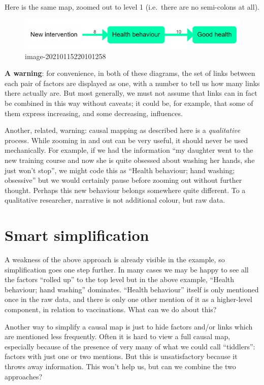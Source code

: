 \documentclass[
]{book}
\begin{document}
Here is the same map, zoomed out to level 1 (i.e.~there are no semi-colons at all).

\begin{figure}
\centering
\includegraphics{_assets/image-20210115220101258.png}
\caption{image-20210115220101258}
\end{figure}

\textbf{A warning}: for convenience, in both of these diagrams, the set of links between each pair of factors are displayed as one, with a number to tell us how many links there actually are. But most generally, we must not assume that links can in fact be combined in this way without caveats; it could be, for example, that some of them express increasing, and some decreasing, influences.

Another, related, warning: causal mapping as described here is a \emph{qualitative} process. While zooming in and out can be very useful, it should never be used mechanically. For example, if we had the information ``my daughter went to the new training course and now she is quite obsessed about washing her hands, she just won't stop'', we might code this as ``Health behaviour; hand washing; obsessive'' but we would certainly pause before zooming out without further thought. Perhaps this new behaviour belongs somewhere quite different. To a qualitative researcher, narrative is not additional colour, but raw data.

\hypertarget{smart-simplification}{%
\section{Smart simplification}\label{smart-simplification}}

A weakness of the above approach is already visible in the example, so simplification goes one step further. In many cases we may be happy to see all the factors ``rolled up'' to the top level but in the above example, ``Health behaviour; hand washing'' dominates. ``Health behaviour'' itself is only mentioned once in the raw data, and there is only one other mention of it as a higher-level component, in relation to vaccinations. What can we do about this?

Another way to simplify a causal map is just to hide factors and/or links which are mentioned less frequently. Often it is hard to view a full causal map, especially because of the presence of very many of what we could call ``tiddlers'': factors with just one or two mentions. But this is unsatisfactory because it throws away information. This won't help us, but can we combine the two approaches?
\end{document}
